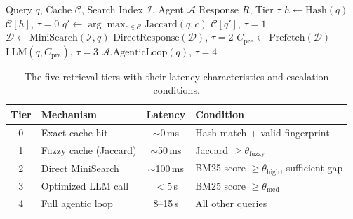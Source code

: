 \documentclass[11pt]{article}
\begin{document}
\begin{algorithm}[t]
\caption{5-Tier Progressive Retrieval}
\label{alg:retrieval}
\begin{algorithmic}[1]
\REQUIRE Query $q$, Cache $\mathcal{C}$, Search Index $\mathcal{I}$, Agent $\mathcal{A}$
\ENSURE Response $R$, Tier $\tau$
\STATE $h \leftarrow \text{Hash}(q)$
  \RETURN $\mathcal{C}[h]$, $\tau = 0$ 
\ENDIF
\STATE $q' \leftarrow \arg\max_{c \in \mathcal{C}} \text{Jaccard}(q, c)$
  \RETURN $\mathcal{C}[q']$, $\tau = 1$ 
\ENDIF
\STATE $\mathcal{D} \leftarrow \text{MiniSearch}(\mathcal{I}, q)$ 
  \RETURN $\text{DirectResponse}(\mathcal{D})$, $\tau = 2$ 
\ENDIF
{}
  \STATE $C_{\text{pre}} \leftarrow \text{Prefetch}(\mathcal{D})$
  \RETURN $\text{LLM}(q, C_{\text{pre}})$, $\tau = 3$ 
\ENDIF
\RETURN $\mathcal{A}.\text{AgenticLoop}(q)$, $\tau = 4$ 
\end{algorithmic}
\end{algorithm}


\begin{table}[t]
\centering
\small
\begin{tabular}{@{}clcl@{}}
\toprule
\textbf{Tier} & \textbf{Mechanism} & \textbf{Latency} & \textbf{Condition} \\
\midrule
0 & Exact cache hit & $\sim$0\,ms & Hash match + valid fingerprint \\
1 & Fuzzy cache (Jaccard) & $\sim$50\,ms & Jaccard $\geq \theta_{\text{fuzzy}}$ \\
2 & Direct MiniSearch & $\sim$100\,ms & BM25 score $\geq \theta_{\text{high}}$, sufficient gap \\
3 & Optimized LLM call & $<$5\,s & BM25 score $\geq \theta_{\text{med}}$ \\
4 & Full agentic loop & 8--15\,s & All other queries \\
\bottomrule
\end{tabular}
\caption{The five retrieval tiers with their latency characteristics and escalation conditions.}
\label{tab:tiers}
\end{table}
\end{document}
